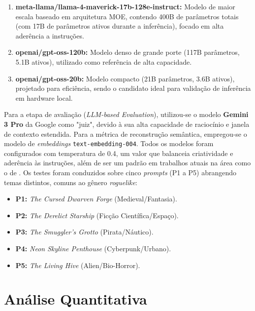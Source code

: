 \begin{enumerate}
    \item \textbf{meta-llama/llama-4-maverick-17b-128e-instruct:} Modelo de
          maior escala baseado em arquitetura \gls{MOE}, contendo 400B de parâmetros
          totais (com 17B de parâmetros ativos durante a inferência), focado em alta
          aderência a instruções.
    \item \textbf{openai/gpt-oss-120b:} Modelo denso de grande porte (117B parâmetros,
          5.1B ativos), utilizado como referência de alta capacidade.
    \item \textbf{openai/gpt-oss-20b:} Modelo compacto (21B parâmetros, 3.6B ativos),
          projetado para eficiência, sendo o candidato ideal para validação de
          inferência em hardware local.
\end{enumerate}

Para a etapa de avaliação (\textit{LLM-based Evaluation}), utilizou-se o modelo
\textbf{Gemini 3 Pro} da Google como "juiz", devido à sua alta capacidade de
raciocínio e janela de contexto estendida. Para a métrica de reconstrução
semântica, empregou-se o modelo de \textit{embeddings}
\texttt{text-embedding-004}. Todos os modelos foram configurados com temperatura
de 0.4, um valor que balanceia criatividade e aderência às instruções, além de
ser um padrão em trabalhos atuais na área como o de
\citeauthor{nasir2024word2world}. Os testes foram conduzidos sobre cinco
\textit{prompts} (P1 a P5) abrangendo temas distintos, comuns ao gênero
\textit{roguelike}:

\begin{itemize}
    \item \textbf{P1:} \textit{The Cursed Dwarven Forge} (Medieval/Fantasia).
    \item \textbf{P2:} \textit{The Derelict Starship} (Ficção Científica/Espaço).
    \item \textbf{P3:} \textit{The Smuggler's Grotto} (Pirata/Náutico).
    \item \textbf{P4:} \textit{Neon Skyline Penthouse} (Cyberpunk/Urbano).
    \item \textbf{P5:} \textit{The Living Hive} (Alien/Bio-Horror).
\end{itemize}

\section{Análise Quantitativa}
\label{sec:analise_quantitativa}

